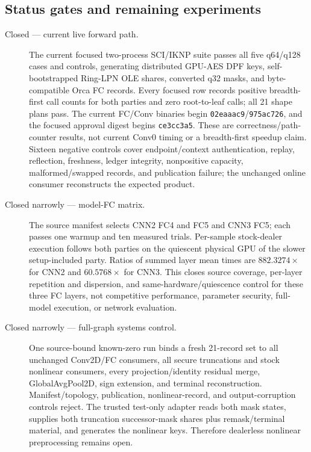 \documentclass[11pt]{article}
\begin{document}
\subsection{Status gates and remaining experiments}
\label{sec:milestones}

\begin{description}
\item[Closed --- current live forward path.] The current focused two-process
  SCI/IKNP suite passes all five q64/q128 cases and controls, generating
  distributed GPU-AES DPF keys, self-bootstrapped Ring-LPN OLE shares, converted
  q32 masks, and byte-compatible Orca FC records. Every focused row records
  positive breadth-first call counts for both parties and zero root-to-leaf
  calls; all 21 shape plans pass. The current FC/Conv binaries begin
  \texttt{02eaaac9}/\texttt{975ac726}, and the focused approval digest begins
  \texttt{ce3cc3a5}. These are correctness/path-counter results, not current
  Conv0 timing or a breadth-first speedup claim. Sixteen negative
  controls cover endpoint/context authentication, replay, reflection, freshness,
  ledger integrity, nonpositive capacity, malformed/swapped records, and
  publication failure; the unchanged online consumer reconstructs the expected
  product.
\item[Closed narrowly --- model-FC matrix.] The source manifest selects CNN2
  FC4 and FC5 and CNN3 FC5; each passes one warmup and ten measured trials.
  Per-sample stock-dealer execution follows both parties on the quiescent
  physical GPU of the slower setup-included party. Ratios of summed
  layer mean times are $882.3274\times$ for CNN2 and $60.5768\times$ for
  CNN3. This closes source coverage, per-layer repetition and dispersion,
  and same-hardware/quiescence control for these three FC layers,
  not competitive performance, parameter security, full-model execution, or
  network evaluation.
\item[Closed narrowly --- full-graph systems control.] One source-bound
  known-zero run binds a fresh 21-record set to all unchanged Conv2D/FC
  consumers, all secure truncations and stock nonlinear consumers, every
  projection/identity residual merge, GlobalAvgPool2D, sign extension, and
  terminal reconstruction. Manifest/topology, publication, nonlinear-record,
  and output-corruption controls reject. The trusted test-only adapter reads
  both mask states, supplies both truncation successor-mask shares plus
  remask/terminal material, and generates the nonlinear keys. Therefore
  dealerless nonlinear preprocessing remains open.

\end{description}
\end{document}
